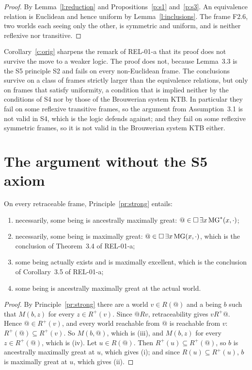 \documentclass{situationist-preprint}
\newcommand{\MG}{\mathrm{MG}}
\newcommand{\MGs}{\mathrm{MG}^{*}}
\newcommand{\Rp}{R^{+}}
\begin{document}
\begin{proof}
By Lemma~\ref{l:reduction} and Propositions~\ref{p:s1} and~\ref{p:s3}. An equivalence relation is Euclidean and hence uniform by Lemma~\ref{l:inclusions}. The frame F2.6, two worlds each seeing only the other, is symmetric and uniform, and is neither reflexive nor transitive.
\end{proof}

Corollary~\ref{c:orig} sharpens the remark of REL-01-a that its proof does not survive the move to a weaker logic. The proof does not, because Lemma~3.3 is the S5 principle S2 and fails on every non-Euclidean frame. The conclusions survive on a class of frames strictly larger than the equivalence relations, but only on frames that satisfy uniformity, a condition that is implied neither by the conditions of S4 nor by those of the Brouwerian system KTB. In particular they fail on some reflexive transitive frames, so the argument from Assumption~3.1 is not valid in S4, which is the logic \citet{Salmon1989} defends against; and they fail on some reflexive symmetric frames, so it is not valid in the Brouwerian system KTB either.

\section{The argument without the S5 axiom}\label{s:main}

\begin{theorem}\label{t:main}
On every retraceable frame, Principle~\ref{pr:strong} entails:
\begin{enumerate}[label=(\roman*)]
\item necessarily, some being is ancestrally maximally great: $@ \in \nec\,\exists x\, \MGs(x,\cdot)$;
\item necessarily, some being is maximally great: $@ \in \nec\,\exists x\, \MG(x,\cdot)$, which is the conclusion of Theorem~3.4 of REL-01-a;
\item some being actually exists and is maximally excellent, which is the conclusion of Corollary~3.5 of REL-01-a;
\item some being is ancestrally maximally great at the actual world.
\end{enumerate}
\end{theorem}

\begin{proof}
By Principle~\ref{pr:strong} there are a world $v \in R(@)$ and a being $b$ such that $M(b,z)$ for every $z \in \Rp(v)$. Since $@ R v$, retraceability gives $v \Rp @$. Hence $@ \in \Rp(v)$, and every world reachable from $@$ is reachable from $v$: $\Rp(@) \subseteq \Rp(v)$. So $M(b,@)$, which is (iii), and $M(b,z)$ for every $z \in \Rp(@)$, which is (iv). Let $u \in R(@)$. Then $\Rp(u) \subseteq \Rp(@)$, so $b$ is ancestrally maximally great at $u$, which gives (i); and since $R(u) \subseteq \Rp(u)$, $b$ is maximally great at $u$, which gives (ii).
\end{proof}
\end{document}
